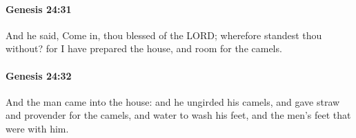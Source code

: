 		\paragraph{Genesis 24:31} %
			\label{GENESIS-24-31}

			And he said, Come in, thou blessed of the LORD; wherefore standest thou without? for I have prepared the house, and room for the camels.


		\paragraph{Genesis 24:32} %
			\label{GENESIS-24-32}

			And the man came into the house: and he ungirded his camels, and gave straw and provender for the camels, and water to wash his feet, and the men's feet that were with him.


